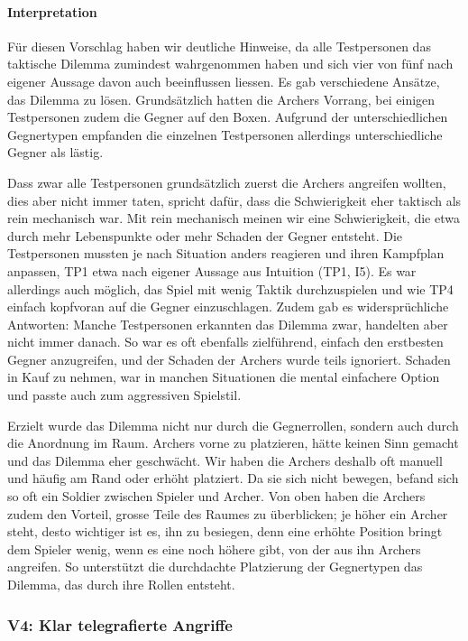 \documentclass[../Main.tex]{subfiles}
\begin{document}
\paragraph{Interpretation}
Für diesen Vorschlag haben wir deutliche Hinweise, da alle Testpersonen das taktische Dilemma zumindest wahrgenommen haben und sich vier von fünf nach eigener Aussage davon auch beeinflussen liessen. Es gab verschiedene Ansätze, das Dilemma zu lösen. Grundsätzlich hatten die Archers Vorrang, bei einigen Testpersonen zudem die Gegner auf den Boxen. Aufgrund der unterschiedlichen Gegnertypen empfanden die einzelnen Testpersonen allerdings unterschiedliche Gegner als lästig.

Dass zwar alle Testpersonen grundsätzlich zuerst die Archers angreifen wollten, dies aber nicht immer taten, spricht dafür, dass die Schwierigkeit eher taktisch als rein mechanisch war. Mit rein mechanisch meinen wir eine Schwierigkeit, die etwa durch mehr Lebenspunkte oder mehr Schaden der Gegner entsteht. Die Testpersonen mussten je nach Situation anders reagieren und ihren Kampfplan anpassen, TP1 etwa nach eigener Aussage aus Intuition (TP1, I5). Es war allerdings auch möglich, das Spiel mit wenig Taktik durchzuspielen und wie TP4 einfach kopfvoran auf die Gegner einzuschlagen. Zudem gab es widersprüchliche Antworten: Manche Testpersonen erkannten das Dilemma zwar, handelten aber nicht immer danach. So war es oft ebenfalls zielführend, einfach den erstbesten Gegner anzugreifen, und der Schaden der Archers wurde teils ignoriert. Schaden in Kauf zu nehmen, war in manchen Situationen die mental einfachere Option und passte auch zum aggressiven Spielstil.

Erzielt wurde das Dilemma nicht nur durch die Gegnerrollen, sondern auch durch die Anordnung im Raum. Archers vorne zu platzieren, hätte keinen Sinn gemacht und das Dilemma eher geschwächt. Wir haben die Archers deshalb oft manuell und häufig am Rand oder erhöht platziert. Da sie sich nicht bewegen, befand sich so oft ein Soldier zwischen Spieler und Archer. Von oben haben die Archers zudem den Vorteil, grosse Teile des Raumes zu überblicken; je höher ein Archer steht, desto wichtiger ist es, ihn zu besiegen, denn eine erhöhte Position bringt dem Spieler wenig, wenn es eine noch höhere gibt, von der aus ihn Archers angreifen. So unterstützt die durchdachte Platzierung der Gegnertypen das Dilemma, das durch ihre Rollen entsteht.

\subsubsection{V4: Klar telegrafierte Angriffe}
\end{document}
